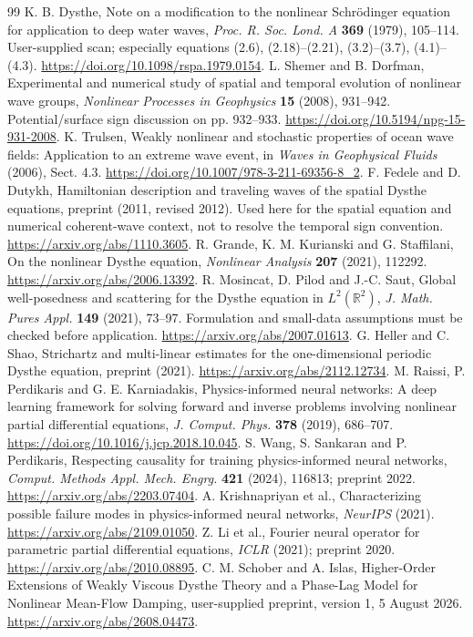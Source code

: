 \small
\begin{thebibliography}{99}
 K. B. Dysthe, Note on a modification to the nonlinear Schr\"odinger equation for application to deep water waves, \emph{Proc. R. Soc. Lond. A} \textbf{369} (1979), 105--114. User-supplied scan; especially equations (2.6), (2.18)--(2.21), (3.2)--(3.7), (4.1)--(4.3). \url{https://doi.org/10.1098/rspa.1979.0154}.
 L. Shemer and B. Dorfman, Experimental and numerical study of spatial and temporal evolution of nonlinear wave groups, \emph{Nonlinear Processes in Geophysics} \textbf{15} (2008), 931--942. Potential/surface sign discussion on pp. 932--933. \url{https://doi.org/10.5194/npg-15-931-2008}.
 K. Trulsen, Weakly nonlinear and stochastic properties of ocean wave fields: Application to an extreme wave event, in \emph{Waves in Geophysical Fluids} (2006), Sect. 4.3. \url{https://doi.org/10.1007/978-3-211-69356-8_2}.
 F. Fedele and D. Dutykh, Hamiltonian description and traveling waves of the spatial Dysthe equations, preprint (2011, revised 2012). Used here for the spatial equation and numerical coherent-wave context, not to resolve the temporal sign convention. \url{https://arxiv.org/abs/1110.3605}.
 R. Grande, K. M. Kurianski and G. Staffilani, On the nonlinear Dysthe equation, \emph{Nonlinear Analysis} \textbf{207} (2021), 112292. \url{https://arxiv.org/abs/2006.13392}.
 R. Mosincat, D. Pilod and J.-C. Saut, Global well-posedness and scattering for the Dysthe equation in $L^2(\mathbb R^2)$, \emph{J. Math. Pures Appl.} \textbf{149} (2021), 73--97. Formulation and small-data assumptions must be checked before application. \url{https://arxiv.org/abs/2007.01613}.
 G. Heller and C. Shao, Strichartz and multi-linear estimates for the one-dimensional periodic Dysthe equation, preprint (2021). \url{https://arxiv.org/abs/2112.12734}.
 M. Raissi, P. Perdikaris and G. E. Karniadakis, Physics-informed neural networks: A deep learning framework for solving forward and inverse problems involving nonlinear partial differential equations, \emph{J. Comput. Phys.} \textbf{378} (2019), 686--707. \url{https://doi.org/10.1016/j.jcp.2018.10.045}.
 S. Wang, S. Sankaran and P. Perdikaris, Respecting causality for training physics-informed neural networks, \emph{Comput. Methods Appl. Mech. Engrg.} \textbf{421} (2024), 116813; preprint 2022. \url{https://arxiv.org/abs/2203.07404}.
 A. Krishnapriyan et al., Characterizing possible failure modes in physics-informed neural networks, \emph{NeurIPS} (2021). \url{https://arxiv.org/abs/2109.01050}.
 Z. Li et al., Fourier neural operator for parametric partial differential equations, \emph{ICLR} (2021); preprint 2020. \url{https://arxiv.org/abs/2010.08895}.
 C. M. Schober and A. Islas, Higher-Order Extensions of Weakly Viscous Dysthe Theory and a Phase-Lag Model for Nonlinear Mean-Flow Damping, user-supplied preprint, version 1, 5 August 2026. \url{https://arxiv.org/abs/2608.04473}.
\end{thebibliography}
